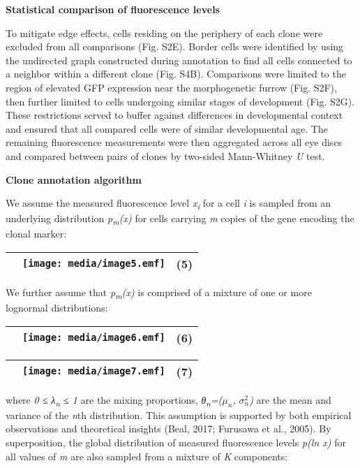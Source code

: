 \textbf{Statistical comparison of fluorescence levels}

To mitigate edge effects, cells residing on the periphery of each clone were excluded from all comparisons (Fig. S2E). Border cells were identified by using the undirected graph constructed during annotation to find all cells connected to a neighbor within a different clone (Fig. S4B). Comparisons were limited to the region of elevated GFP expression near the morphogenetic furrow (Fig. S2F), then further limited to cells undergoing similar stages of development (Fig. S2G). These restrictions served to buffer against differences in developmental context and ensured that all compared cells were of similar developmental age. The remaining fluorescence measurements were then aggregated across all eye discs and compared between pairs of clones by two-sided Mann-Whitney \emph{U} test.

\textbf{Clone annotation algorithm}

We assume the measured fluorescence level \emph{x\textsubscript{i}} for a cell \emph{i} is sampled from an underlying distribution \emph{p\textsubscript{m}(x)} for cells carrying \emph{m} copies of the gene encoding the clonal marker:

\begin{longtable}[]{@{}lll@{}}
\toprule
& \texttt{[image: media/image5.emf]} & (5)\tabularnewline
\bottomrule
\end{longtable}

We further assume that \emph{p\textsubscript{m}(x)} is comprised of a mixture of one or more lognormal distributions:

\begin{longtable}[]{@{}lll@{}}
\toprule
& \texttt{[image: media/image6.emf]} & (6)\tabularnewline
\bottomrule
\end{longtable}

\begin{longtable}[]{@{}lll@{}}
\toprule
& \texttt{[image: media/image7.emf]} & (7)\tabularnewline
\bottomrule
\end{longtable}

where \emph{0 ≤ λ\textsubscript{n} ≤ 1} are the mixing proportions, \emph{θ\textsubscript{n}=(}\(\mu_{n}\)\emph{,} \(\sigma_{n}^{2}\)\emph{)} are the mean and variance of the \emph{n}th distribution. This assumption is supported by both empirical observations and theoretical insights (Beal, 2017; Furusawa et al., 2005). By superposition, the global distribution of measured fluorescence levels \emph{p(ln x)} for all values of \emph{m} are also sampled from a mixture of \emph{K} components:

